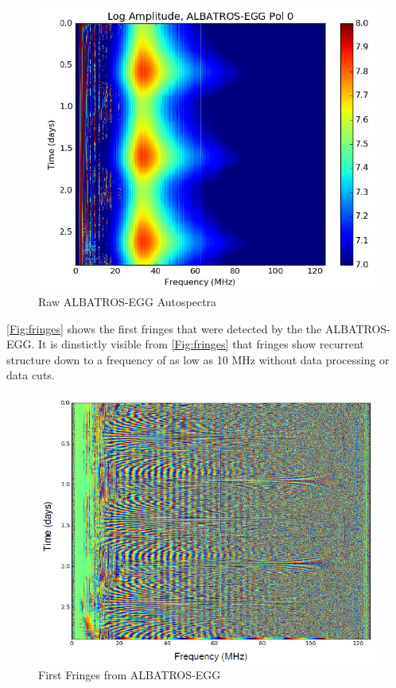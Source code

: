 \documentclass{ws-jai}
\begin{document}
\begin{figure}[h!]
	\begin{center}
		\includegraphics[width=0.8\linewidth]{Figures/Raw-ALBATROS-autospectra.PNG}
		\caption{Raw ALBATROS-EGG Autospectra}
		\label{Fig:auto}
	\end{center}
\end{figure}

\autoref{Fig:fringes} shows the first fringes that were detected by the the ALBATROS-EGG. It is dinstictly visible from \autoref{Fig:fringes} that fringes show recurrent structure down to a frequency of as low as 10 MHz without data processing or data cuts.

\begin{figure}[ht!]
	\begin{center}
		\includegraphics[width=0.7\linewidth]{Figures/First-fringes-of-ALBATROS-EGG.PNG}
		\caption{First Fringes from ALBATROS-EGG}
		\label{Fig:fringes}
	\end{center}
\end{figure}
\end{document}
